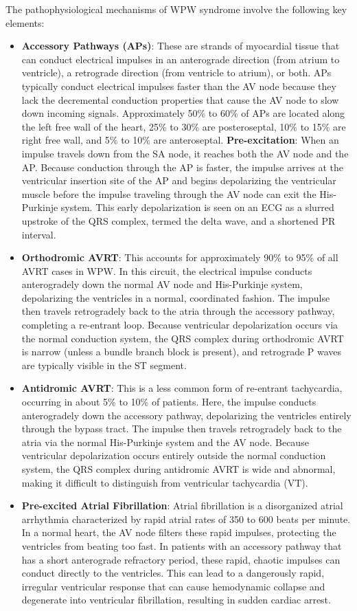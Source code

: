 The pathophysiological mechanisms of WPW syndrome involve the following key elements:
\begin{itemize}
  \item \textbf{Accessory Pathways (APs)}: These are strands of myocardial tissue that can conduct electrical impulses in an anterograde direction (from atrium to ventricle), a retrograde direction (from ventricle to atrium), or both. APs typically conduct electrical impulses faster than the AV node because they lack the decremental conduction properties that cause the AV node to slow down incoming signals. Approximately 50\% to 60\% of APs are located along the left free wall of the heart, 25\% to 30\% are posteroseptal, 10\% to 15\% are right free wall, and 5\% to 10\% are anteroseptal.
  \textbf{Pre-excitation}: When an impulse travels down from the SA node, it reaches both the AV node and the AP. Because conduction through the AP is faster, the impulse arrives at the ventricular insertion site of the AP and begins depolarizing the ventricular muscle before the impulse traveling through the AV node can exit the His-Purkinje system. This early depolarization is seen on an ECG as a slurred upstroke of the QRS complex, termed the delta wave, and a shortened PR interval.
  \item \textbf{Orthodromic AVRT}: This accounts for approximately 90\% to 95\% of all AVRT cases in WPW. In this circuit, the electrical impulse conducts anterogradely down the normal AV node and His-Purkinje system, depolarizing the ventricles in a normal, coordinated fashion. The impulse then travels retrogradely back to the atria through the accessory pathway, completing a re-entrant loop. Because ventricular depolarization occurs via the normal conduction system, the QRS complex during orthodromic AVRT is narrow (unless a bundle branch block is present), and retrograde P waves are typically visible in the ST segment.
  \item \textbf{Antidromic AVRT}: This is a less common form of re-entrant tachycardia, occurring in about 5\% to 10\% of patients. Here, the impulse conducts anterogradely down the accessory pathway, depolarizing the ventricles entirely through the bypass tract. The impulse then travels retrogradely back to the atria via the normal His-Purkinje system and the AV node. Because ventricular depolarization occurs entirely outside the normal conduction system, the QRS complex during antidromic AVRT is wide and abnormal, making it difficult to distinguish from ventricular tachycardia (VT).
  \item \textbf{Pre-excited Atrial Fibrillation}: Atrial fibrillation is a disorganized atrial arrhythmia characterized by rapid atrial rates of 350 to 600 beats per minute. In a normal heart, the AV node filters these rapid impulses, protecting the ventricles from beating too fast. In patients with an accessory pathway that has a short anterograde refractory period, these rapid, chaotic impulses can conduct directly to the ventricles. This can lead to a dangerously rapid, irregular ventricular response that can cause hemodynamic collapse and degenerate into ventricular fibrillation, resulting in sudden cardiac arrest.

\end{itemize}
